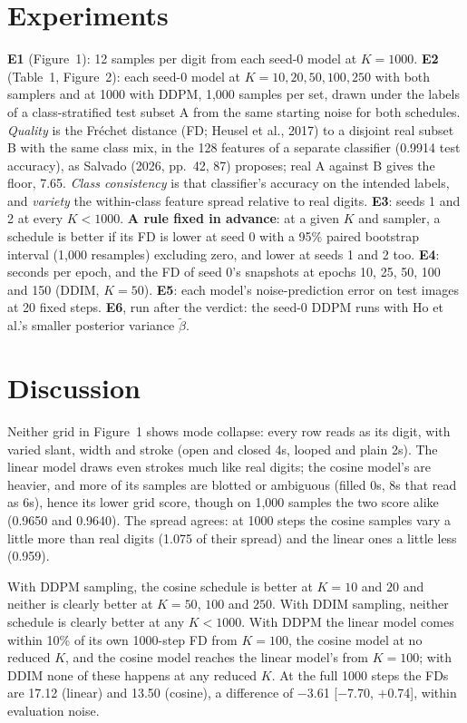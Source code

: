 \documentclass[10pt,a4paper,twocolumn]{article}
\begin{document}
\section{Experiments}
\textbf{E1} (Figure~1): 12 samples per digit from each seed-0 model at $K = 1000$.
\textbf{E2} (Table~1, Figure~2): each seed-0 model at $K = 10, 20, 50, 100, 250$ with both
samplers and at 1000 with DDPM, 1,000 samples per set, drawn under the labels of a
class-stratified test subset A from the same starting noise for both schedules. \emph{Quality} is
the Fr\'echet distance (FD; Heusel et al., 2017) to a disjoint real subset B with the same class
mix, in the 128 features of a separate classifier (0.9914 test accuracy), as Salvado (2026,
pp.~42, 87) proposes; real A against B gives the floor, 7.65. \emph{Class consistency} is that
classifier's accuracy on the intended labels, and \emph{variety} the within-class feature spread
relative to real digits. \textbf{E3}: seeds 1 and 2 at every $K < 1000$. \textbf{A rule fixed in
advance}: at a given $K$ and sampler, a schedule is better if its FD is lower at seed 0 with a
95\% paired bootstrap interval (1,000 resamples) excluding zero, and lower at seeds 1 and 2 too.
\textbf{E4}: seconds per epoch, and the FD of seed 0's snapshots at epochs 10, 25, 50, 100 and
150 (DDIM, $K = 50$). \textbf{E5}: each model's noise-prediction error on test images at 20
fixed steps. \textbf{E6}, run after the verdict: the seed-0 DDPM runs with Ho et al.'s smaller
posterior variance $\tilde\beta$.

\section{Discussion}
Neither grid in Figure~1 shows mode collapse: every row reads as its digit, with varied slant,
width and stroke (open and closed 4s, looped and plain 2s). The linear model draws even strokes
much like real digits; the cosine model's are heavier, and more of its samples are blotted or
ambiguous (filled 0s, 8s that read as 6s), hence its lower grid score, though on 1,000 samples
the two score alike (0.9650 and 0.9640). The spread agrees: at 1000
steps the cosine samples vary a little more than real digits (1.075 of their
spread) and the linear ones a little less (0.959).

With DDPM sampling, the cosine schedule is better at $K = 10$ and $20$ and neither is clearly better at $K = 50$, $100$ and $250$. With DDIM sampling, neither schedule is clearly better at any $K < 1000$. With DDPM the linear model comes within 10\% of its own 1000-step FD from $K = 100$, the cosine model at no reduced $K$, and the cosine model reaches the linear model's from $K = 100$; with DDIM none of these happens at any reduced $K$. At the full 1000 steps the FDs are 17.12 (linear) and 13.50 (cosine), a difference of $-$3.61 [$-$7.70, $+$0.74], within evaluation noise.
\end{document}

